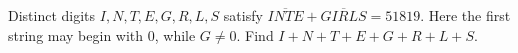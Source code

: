 Distinct digits $I,N,T,E,G,R,L,S$ satisfy $\overline{INTE}+\overline{GIRLS}=51819$. Here the first string may begin with 0, while $G\ne0$. Find $I+N+T+E+G+R+L+S$.
